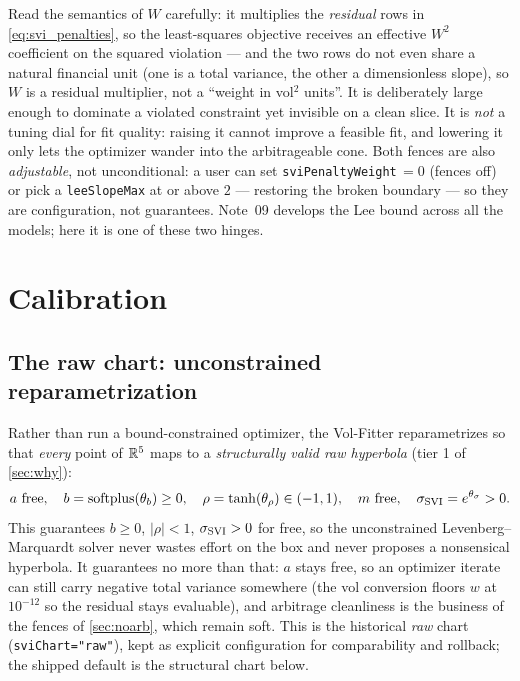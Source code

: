 \documentclass[11pt]{article}
\begin{document}
\begin{caution}
Read the semantics of $W$ carefully: it multiplies the \emph{residual} rows in
\eqref{eq:svi_penalties}, so the least-squares objective receives an effective
$W^2$ coefficient on the squared violation --- and the two rows do not even
share a natural financial unit (one is a total variance, the other a
dimensionless slope), so $W$ is a residual multiplier, not a ``weight in
vol$^2$ units''. It is deliberately large enough to dominate a violated
constraint yet invisible on a clean slice. It is \emph{not} a tuning dial for
fit quality: raising it cannot improve a feasible fit, and lowering it only
lets the optimizer wander into the arbitrageable cone. Both fences are also
\emph{adjustable}, not unconditional: a user can set
\texttt{sviPenaltyWeight}$\,=0$ (fences off) or pick a \texttt{leeSlopeMax}
at or above $2$ --- restoring the broken boundary --- so they are
configuration, not guarantees. Note~09 develops the Lee bound across all the
models; here it is one of these two hinges.
\end{caution}

\section{Calibration}
\label{sec:calib}

\subsection{The raw chart: unconstrained reparametrization}

Rather than run a bound-constrained optimizer, the Vol-Fitter reparametrizes so
that \emph{every} point of $\mathbb{R}^5$ maps to a \emph{structurally valid raw
hyperbola} (tier 1 of \cref{sec:why}):
\begin{equation}
a\ \text{free},\quad
b=\operatorname{softplus}(\theta_b)\ge 0,\quad
\rho=\tanh(\theta_\rho)\in(-1,1),\quad
m\ \text{free},\quad
\sigsvi=e^{\theta_\sigma}>0.
\label{eq:reparam}
\end{equation}
This guarantees $b\ge0$, $|\rho|<1$, $\sigma_{\mathrm{SVI}}>0$ for free, so the unconstrained
Levenberg--Marquardt solver never wastes effort on the box and never proposes a
nonsensical hyperbola. It guarantees no more than that: $a$ stays free, so an
optimizer iterate can still carry negative total variance somewhere (the vol
conversion floors $w$ at $10^{-12}$ so the residual stays evaluable), and
arbitrage cleanliness is the business of the fences of \cref{sec:noarb}, which
remain soft. This is the historical \emph{raw} chart
(\texttt{sviChart="raw"}), kept as explicit configuration for comparability
and rollback; the shipped default is the structural chart below.
\end{document}
